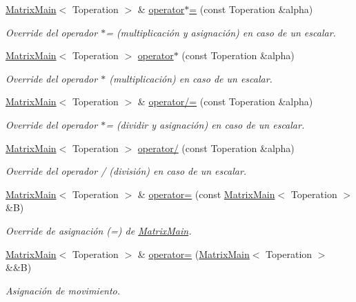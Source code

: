 \begin{DoxyCompactItemize}
\hyperlink{classMatrixMain}{Matrix\+Main}$<$ Toperation $>$ \& \hyperlink{classMatrixMain_ab1a843f990bf1fd8bf644780bac68b46}{operator$\ast$=} (const Toperation \&alpha)
\begin{DoxyCompactList}\small\item\em Override del operador $\ast$= (multiplicación y asignación) en caso de un escalar. \end{DoxyCompactList}\item 
\hyperlink{classMatrixMain}{Matrix\+Main}$<$ Toperation $>$ \hyperlink{classMatrixMain_a2192d54d74edc3e7b2fce277fd2a214f}{operator$\ast$} (const Toperation \&alpha)
\begin{DoxyCompactList}\small\item\em Override del operador $\ast$ (multiplicación) en caso de un escalar. \end{DoxyCompactList}\item 
\hyperlink{classMatrixMain}{Matrix\+Main}$<$ Toperation $>$ \& \hyperlink{classMatrixMain_a7533eb0bf566b392286134979c2240f7}{operator/=} (const Toperation \&alpha)
\begin{DoxyCompactList}\small\item\em Override del operador $\ast$= (dividir y asignación) en caso de un escalar. \end{DoxyCompactList}\item 
\hyperlink{classMatrixMain}{Matrix\+Main}$<$ Toperation $>$ \hyperlink{classMatrixMain_aa18465b7a138010a03901c266f8aa306}{operator/} (const Toperation \&alpha)
\begin{DoxyCompactList}\small\item\em Override del operador / (división) en caso de un escalar. \end{DoxyCompactList}\item 
\hyperlink{classMatrixMain}{Matrix\+Main}$<$ Toperation $>$ \& \hyperlink{classMatrixMain_a7b5bc59c186622de3497b5d70f4ac6af}{operator=} (const \hyperlink{classMatrixMain}{Matrix\+Main}$<$ Toperation $>$ \&B)
\begin{DoxyCompactList}\small\item\em Override de asignación (=) de \hyperlink{classMatrixMain}{Matrix\+Main}. \end{DoxyCompactList}\item 
\hyperlink{classMatrixMain}{Matrix\+Main}$<$ Toperation $>$ \& \hyperlink{classMatrixMain_a04803e3d88409e75bf45dfde76b640b5}{operator=} (\hyperlink{classMatrixMain}{Matrix\+Main}$<$ Toperation $>$ \&\&B)
\begin{DoxyCompactList}\small\item\em Asignación de movimiento. \end{DoxyCompactList}\item 

\end{DoxyCompactItemize}
